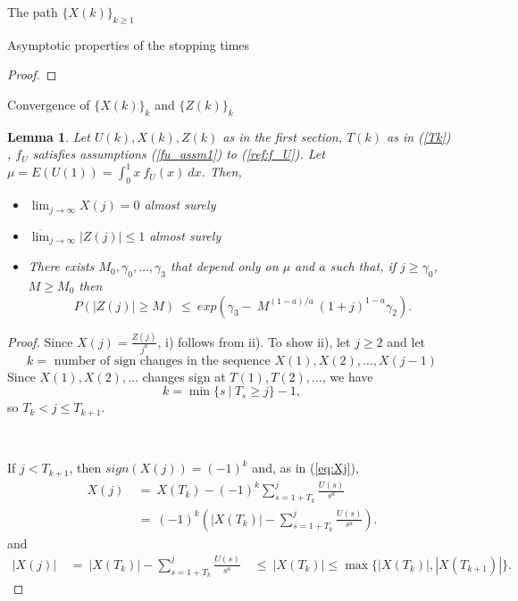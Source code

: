 \documentclass[12pt]{article}
\newtheorem{lemma}[theorem]{Lemma}
\begin{document}
\begin{section}{The path $\{X(k)\}_{k\ge1}$ }
\begin{subsection}{Asymptotic properties of the stopping times}
\begin{proof}
\end{proof}


\end{subsection}




\begin{subsection}{Convergence of $\{X(k)\}_k$ and $\{Z(k)\}_k$}


\begin{lemma} \label{lm:XZ convrgnce}
Let $U(k),X(k),Z(k)$ as in the first section, $T(k)$ as in (\ref{Tk}) , $f_U$ satisfies assumptions (\ref{fu_assm1}) to (\ref{ref:f_U}). Let $\mu = E(U(1)) = \int_{0}^{1} x \ f_U(x) \ dx$. Then,
\begin{itemize}
	\item[i.] $\lim_{j \rightarrow \infty } X(j) = 0$ almost surely
	\item[ii.] $\overline{ \lim}_{j \rightarrow \infty} |Z(j)| \le 1$ almost surely
	\item[iii.] There exists $M_0, \gamma_0, \dots, \gamma_3$ that depend only on $\mu$ and $a$ such that, if $j \ge \gamma_0$, $M \ge M_0$  then
	\begin{equation*}
	P(|Z(j)| \ge M) ~\le~ exp(\gamma_3 - \ M^{(1-a)/a} \ (1+j)^{1-a} \gamma_2  ).
	\end{equation*}
\end{itemize}
\end{lemma}

\begin{proof} Since $X(j) = \frac{Z(j)}{j^a}$, i) follows from ii). To show ii), let $j\ge 2$ and let 
	$$
	k = \text{ number of sign changes in the sequence } X(1),X(2),\dots,X(j-1)
	$$
Since $X(1),X(2),\dots$ changes sign at $T(1),T(2),\dots$, we have 
	$$
	k = \min\{s\ |\ T_s\ge j\} - 1 ,
	$$
so $T_{k} < j \le T_{k+1}$.	 

\  

If $j < T_{k+1}$, then $sign(X(j)) = (-1)^k$ and, as in (\ref{eq:Xj}),
\begin{align*}
X(j) &~=~ X(T_{k}) - (-1)^k \sum_{s=1+T_{k}}^{j} \frac{U(s)}{s^a} \\
  &~=~ (-1)^{k} \left( |X(T_{k})| - \sum_{s=1+T_{k}}^{j} \frac{U(s)}{s^a} \right).
\end{align*}   
and 
\begin{align*}
|X(j)| &~=~ |X(T_{k})| - \sum_{s=1+T_{k}}^{j} \frac{U(s)}{s^a} 
   & ~\le~ |X(T_{k})| \le \max \{|X(T_{k})|, |X(T_{k+1})|\}.
\end{align*}


\end{proof}
\end{subsection}
\end{section}
\end{document}
